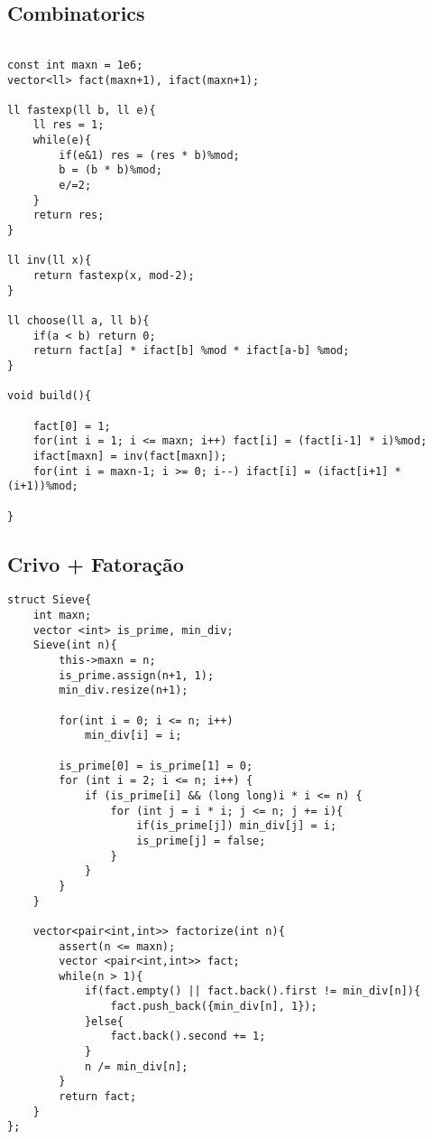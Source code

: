 \documentclass[11pt, a4paper, twoside]{article}
\begin{document}
\subsection{Combinatorics}
\begin{verbatim}

const int maxn = 1e6;
vector<ll> fact(maxn+1), ifact(maxn+1);

ll fastexp(ll b, ll e){
    ll res = 1;
    while(e){
        if(e&1) res = (res * b)%mod;
        b = (b * b)%mod;
        e/=2;
    }
    return res;
}

ll inv(ll x){
    return fastexp(x, mod-2);
}

ll choose(ll a, ll b){
    if(a < b) return 0;
    return fact[a] * ifact[b] %mod * ifact[a-b] %mod;    
}

void build(){
    
    fact[0] = 1;
    for(int i = 1; i <= maxn; i++) fact[i] = (fact[i-1] * i)%mod;
    ifact[maxn] = inv(fact[maxn]);
    for(int i = maxn-1; i >= 0; i--) ifact[i] = (ifact[i+1] * (i+1))%mod;
    
}
\end{verbatim}

\subsection{Crivo + Fatoração}
\begin{verbatim}
struct Sieve{
    int maxn;
    vector <int> is_prime, min_div;
    Sieve(int n){
        this->maxn = n;
        is_prime.assign(n+1, 1);
        min_div.resize(n+1);
    
        for(int i = 0; i <= n; i++)
            min_div[i] = i;
    
        is_prime[0] = is_prime[1] = 0;
        for (int i = 2; i <= n; i++) {
            if (is_prime[i] && (long long)i * i <= n) {
                for (int j = i * i; j <= n; j += i){
                    if(is_prime[j]) min_div[j] = i;
                    is_prime[j] = false;
                }
            }
        }
    }
    
    vector<pair<int,int>> factorize(int n){
        assert(n <= maxn);
        vector <pair<int,int>> fact;
        while(n > 1){
            if(fact.empty() || fact.back().first != min_div[n]){
                fact.push_back({min_div[n], 1});
            }else{
                fact.back().second += 1;
            }
            n /= min_div[n];
        }
        return fact;
    }
};
\end{verbatim}
\end{document}
